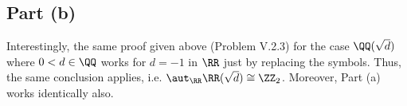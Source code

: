 \subsection*{Part (b)}
Interestingly, the same proof given above (Problem V.2.3) for the case $\QQ(\sqrt{d})$ where $0<d\in \QQ$ works for $d= -1$ in $\RR$ just by replacing the symbols. Thus, the same conclusion applies, i.e. $\aut_\RR\RR(\sqrt{d} )\cong \ZZ_2$. Moreover, Part (a) works identically also.
